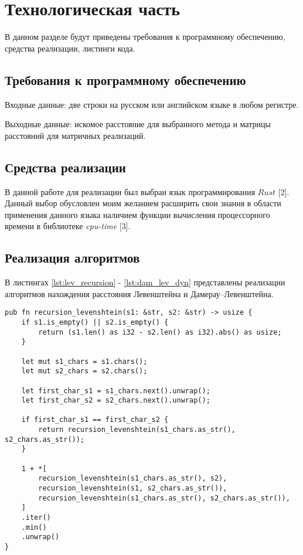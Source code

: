 \chapter{Технологическая часть}

В данном разделе будут приведены требования к программному обеспечению, средства реализации, листинги кода.

\section{Требования к программному обеспечению}

Входные данные: две строки на русском или английском языке в любом регистре.

Выходные данные: искомое расстояние для выбранного метода и матрицы расстояний для матричных реализаций.

\section{Средства реализации}
В данной работе для реализации был выбран язык программирования $Rust$ [2]. Данный выбор обусловлен моим желанием расширить свои знания в области применения данного языка наличием функции вычисления процессорного времени в библиотеке \textit{cpu-time} [3].

\section{Реализация алгоритмов}

В листингах \ref{lst:lev_recursion} - \ref{lst:dam_lev_dyn} представлены реализации алгоритмов нахождения расстояния Левенштейна и Дамерау–Левенштейна.

\clearpage

\begin{center}
\captionsetup{justification=raggedright,singlelinecheck=off}
\begin{lstlisting}[label=lst:lev_recursion,caption=Функция нахождения расстояния Левенштейна рекурсивно]
pub fn recursion_levenshtein(s1: &str, s2: &str) -> usize {
    if s1.is_empty() || s2.is_empty() {
        return (s1.len() as i32 - s2.len() as i32).abs() as usize;
    }

    let mut s1_chars = s1.chars();
    let mut s2_chars = s2.chars();

    let first_char_s1 = s1_chars.next().unwrap();
    let first_char_s2 = s2_chars.next().unwrap();

    if first_char_s1 == first_char_s2 {
        return recursion_levenshtein(s1_chars.as_str(), s2_chars.as_str());
    }

    1 + *[
        recursion_levenshtein(s1_chars.as_str(), s2),
        recursion_levenshtein(s1, s2_chars.as_str()),
        recursion_levenshtein(s1_chars.as_str(), s2_chars.as_str()),
    ]
    .iter()
    .min()
    .unwrap()
}
\end{lstlisting}
\end{center}


